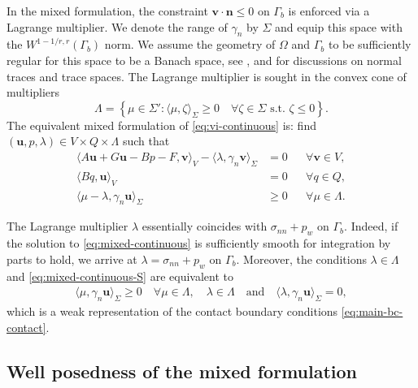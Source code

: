 \documentclass[onefignum,onetabnum]{siamart190516}
\newcommand{\bn}{\boldsymbol{n}}
\newcommand{\bu}{\boldsymbol{u}}
\newcommand{\bv}{\boldsymbol{v}}
\begin{document}
In the mixed formulation, the constraint $\bv\cdot\bn \leq 0$ on $\Gamma_b$ is enforced via a Lagrange multiplier. We denote the range of $\gamma_n$ by $\Sigma$ and equip this space with the $W^{1-1/r,r}(\Gamma_b)$ norm. We assume the geometry of $\Omega$ and $\Gamma_b$ to be sufficiently regular for this space to be a Banach space, see \cite[Section 5]{kikuchi1988}, \cite[Chapter III]{haslinger1996} and \cite[Chapter 7]{adams2003} for discussions on normal traces and trace spaces. The Lagrange multiplier is sought in the convex cone of multipliers
%
\[
	\Lambda = \left\lbrace \mu\in \Sigma' : \langle \mu, \zeta \rangle_\Sigma \geq 0 \quad \text{$\forall \zeta\in\Sigma$ s.t. $\zeta \leq 0$} \right\rbrace.
\]
%
The equivalent mixed formulation of \eqref{eq:vi-continuous} is: find $(\bu,p,\lambda)\in V\times Q\times \Lambda$ such that
%
\begin{subequations}\label{eq:mixed-continuous}
\begin{align}
	\langle A\bu + G \bu - Bp - F, \bv \rangle_V - \langle \lambda, \gamma_n\bv\rangle_\Sigma &=0 && \forall\bv\in V, \label{eq:mixed-continuous-V}\\
	 \langle Bq,\bu \rangle_V &= 0 && \forall q\in Q,\\
	 \langle \mu - \lambda, \gamma_n\bu\rangle_\Sigma &\geq 0 && \forall \mu\in \Lambda. \label{eq:mixed-continuous-S}
\end{align}
\end{subequations}

The Lagrange multiplier $\lambda$ essentially coincides with $\sigma_{nn} + p_w$ on $\Gamma_b$. Indeed, if the solution to \eqref{eq:mixed-continuous} is sufficiently smooth for integration by parts to hold, we arrive at $\lambda = \sigma_{nn} + p_w$ on $\Gamma_b$. Moreover, the conditions $\lambda\in\Lambda$ and \eqref{eq:mixed-continuous-S} are equivalent to
%
\begin{align}\label{eq:weak-contact-conditions}
	\langle \mu, \gamma_n\bu\rangle_\Sigma \geq 0 \quad \forall \mu\in\Lambda, \quad \lambda\in\Lambda \quad \text{and} \quad \langle \lambda, \gamma_n\bu \rangle_\Sigma = 0,
\end{align}
%
which is a weak representation of the contact boundary conditions \eqref{eq:main-bc-contact}.

\subsection{Well posedness of the mixed formulation}
\end{document}
